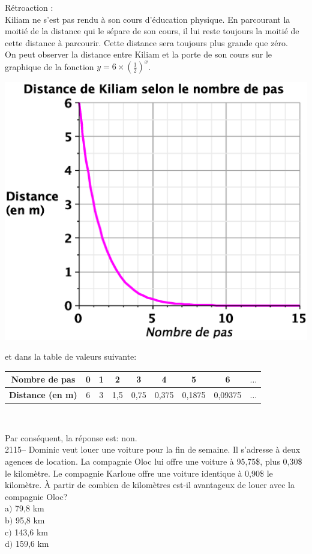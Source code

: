 \documentclass[letterpaper, 12pt]{article}
\begin{document}
R\'etroaction :\\
Kiliam ne s'est pas rendu \`a son cours d'\'education physique. En parcourant la moiti\'e de la distance qui le s\'epare de son cours, il lui reste toujours la moiti\'e de cette distance \`a parcourir. Cette distance sera toujours plus grande que z\'ero.\\
On peut observer la distance entre Kiliam et la porte de son cours sur le graphique de la fonction $y=6\times \left(\frac{1}{2}\right)^{x}$.\\
\begin{center}
 \includegraphics[width=8 cm,bb=20 161 575 630]{Q2085a.eps}
\end{center}
et dans la table de valeurs suivante:
\begin{center}
 \begin{tabular}{|c||c| c | c | c | c | c | c | c |} \hline
{\bf Nombre de pas} & 0 & 1 & 2 & 3 & 4 & 5 & 6 & $\ldots$ \\ \hline
{\bf Distance (en m)} & 6 & 3 & 1,5 & 0,75 & 0,375 & 0,1875 & 0,09375 & $\ldots$ \\ \hline
\end{tabular}\\[2mm]
\end{center}
Par cons\'equent, la r\'eponse est: non.\\

2115-- Dominic veut louer une voiture pour la fin de semaine. Il s'adresse \`a deux agences de location. La compagnie Oloc lui offre une voiture \`a 95,75\$, plus 0,30\$ le kilom\`etre. Le compagnie Karloue offre une voiture identique \`a 0,90\$ le kilom\`etre. \`A partir de combien de kilom\`etres est-il avantageux de louer avec la compagnie Oloc?\\

a$)$ 79,8 km\\
b$)$ 95,8 km\\
c$)$ 143,6 km\\
d$)$ 159,6 km\\
\end{document}
